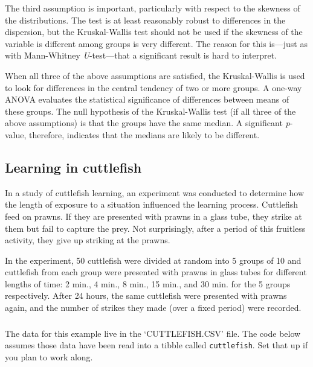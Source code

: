 \documentclass[
]{book}
\newenvironment{greybox}{
  \definecolor{shadecolor}{rgb}{0.95,0.95,0.95}  %
  \color{black}
  \begin{shaded}}
 {\end{shaded}}
\newenvironment{infobox}[1]
  {
  \begin{itemize}
  \renewcommand{\labelitemi}{
    \raisebox{-.7\height}[0pt][0pt]{
      {\setkeys{Gin}{width=3em,keepaspectratio}
        \texttt{[image: images/\#1]}}
    }
  }
  \setlength{\fboxsep}{1em}
  \begin{greybox}
  \item
  }
  {
  \end{greybox}
  \end{itemize}
  }
\begin{document}
The third assumption is important, particularly with respect to the skewness of the distributions. The test is at least reasonably robust to differences in the dispersion, but the Kruskal-Wallis test should not be used if the skewness of the variable is different among groups is very different. The reason for this is---just as with Mann-Whitney \emph{U}-test---that a significant result is hard to interpret.

When all three of the above assumptions are satisfied, the Kruskal-Wallis is used to look for differences in the central tendency of two or more groups. A one-way ANOVA evaluates the statistical significance of differences between means of these groups. The null hypothesis of the Kruskal-Wallis test (if all three of the above assumptions) is that the groups have the same median. A significant \emph{p}-value, therefore, indicates that the medians are likely to be different.

\hypertarget{learning-in-cuttlefish}{%
\subsection{Learning in cuttlefish}\label{learning-in-cuttlefish}}

In a study of cuttlefish learning, an experiment was conducted to determine how the length of exposure to a situation influenced the learning process. Cuttlefish feed on prawns. If they are presented with prawns in a glass tube, they strike at them but fail to capture the prey. Not surprisingly, after a period of this fruitless activity, they give up striking at the prawns.

In the experiment, 50 cuttlefish were divided at random into 5 groups of 10 and cuttlefish from each group were presented with prawns in glass tubes for different lengths of time: 2 min., 4 min., 8 min., 15 min., and 30 min. for the 5 groups respectively. After 24 hours, the same cuttlefish were presented with prawns again, and the number of strikes they made (over a fixed period) were recorded.

\begin{infobox}{action}

\hypertarget{section-23}{%
\subsubsection*{}\label{section-23}}

The data for this example live in the `CUTTLEFISH.CSV' file. The code below assumes those data have been read into a tibble called \texttt{cuttlefish}. Set that up if you plan to work along.

\end{infobox}
\end{document}
